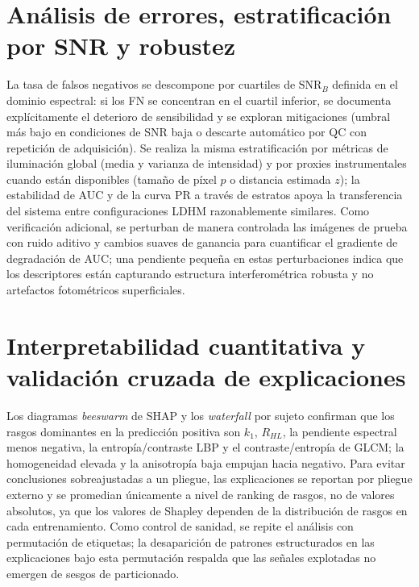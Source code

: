 \section*{Análisis de errores, estratificación por SNR y robustez}
La tasa de falsos negativos se descompone por cuartiles de $\mathrm{SNR}_B$ definida en el dominio espectral: si los FN se concentran en el cuartil inferior, se documenta explícitamente el deterioro de sensibilidad y se exploran mitigaciones (umbral más bajo en condiciones de SNR baja o descarte automático por QC con repetición de adquisición). Se realiza la misma estratificación por métricas de iluminación global (media y varianza de intensidad) y por proxies instrumentales cuando están disponibles (tamaño de píxel $p$ o distancia estimada $z$); la estabilidad de AUC y de la curva PR a través de estratos apoya la transferencia del sistema entre configuraciones LDHM razonablemente similares. Como verificación adicional, se perturban de manera controlada las imágenes de prueba con ruido aditivo y cambios suaves de ganancia para cuantificar el gradiente de degradación de AUC; una pendiente pequeña en estas perturbaciones indica que los descriptores están capturando estructura interferométrica robusta y no artefactos fotométricos superficiales.

\section*{Interpretabilidad cuantitativa y validación cruzada de explicaciones}
Los diagramas \emph{beeswarm} de SHAP y los \emph{waterfall} por sujeto confirman que los rasgos dominantes en la predicción positiva son $k_1$, $R_{HL}$, la pendiente espectral menos negativa, la entropía/contraste LBP y el contraste/entropía de GLCM; la homogeneidad elevada y la anisotropía baja empujan hacia negativo. Para evitar conclusiones sobreajustadas a un pliegue, las explicaciones se reportan por pliegue externo y se promedian únicamente a nivel de ranking de rasgos, no de valores absolutos, ya que los valores de Shapley dependen de la distribución de rasgos en cada entrenamiento. Como control de sanidad, se repite el análisis con permutación de etiquetas; la desaparición de patrones estructurados en las explicaciones bajo esta permutación respalda que las señales explotadas no emergen de sesgos de particionado.

